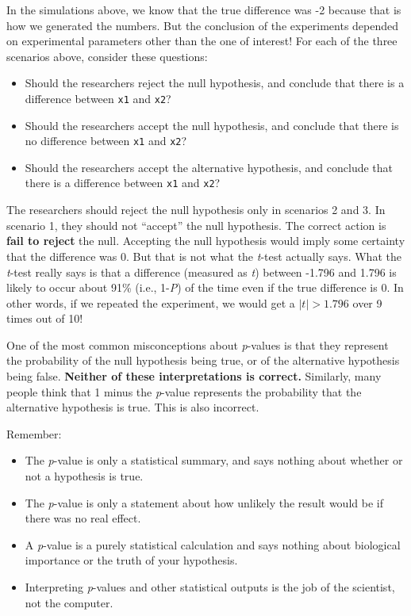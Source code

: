 \documentclass[
  13,
  letterpaper,
]{report}
\providecommand{\tightlist}{%
  \setlength{\itemsep}{0pt}\setlength{\parskip}{0pt}}
\begin{document}
In the simulations above, we know that the true difference was -2
because that is how we generated the numbers. But the conclusion of the
experiments depended on experimental parameters other than the one of
interest! For each of the three scenarios above, consider these
questions:

\begin{itemize}
\tightlist
\item
  Should the researchers reject the null hypothesis, and conclude that
  there is a difference between \texttt{x1} and \texttt{x2}?
\item
  Should the researchers accept the null hypothesis, and conclude that
  there is no difference between \texttt{x1} and \texttt{x2}?
\item
  Should the researchers accept the alternative hypothesis, and conclude
  that there is a difference between \texttt{x1} and \texttt{x2}?
\end{itemize}

The researchers should reject the null hypothesis only in scenarios 2
and 3. In scenario 1, they should not ``accept'' the null hypothesis.
The correct action is \textbf{fail to reject} the null. Accepting the
null hypothesis would imply some certainty that the difference was 0.
But that is not what the \emph{t}-test actually says. What the
\emph{t}-test really says is that a difference (measured as \emph{t})
between -1.796 and 1.796 is likely to occur about 91\% (i.e.,
1-\emph{P}) of the time even if the true difference is 0. In other
words, if we repeated the experiment, we would get a \(|t|>1.796\) over
9 times out of 10!

One of the most common misconceptions about \emph{p}-values is that they
represent the probability of the null hypothesis being true, or of the
alternative hypothesis being false. \textbf{Neither of these
interpretations is correct.} Similarly, many people think that 1 minus
the \emph{p}-value represents the probability that the alternative
hypothesis is true. This is also incorrect.

Remember:

\begin{itemize}
\tightlist
\item
  The \emph{p}-value is only a statistical summary, and says nothing
  about whether or not a hypothesis is true.
\item
  The \emph{p}-value is only a statement about how unlikely the result
  would be if there was no real effect.
\item
  A \emph{p}-value is a purely statistical calculation and says nothing
  about biological importance or the truth of your hypothesis.
\item
  Interpreting \emph{p}-values and other statistical outputs is the job
  of the scientist, not the computer.
\end{itemize}
\end{document}

